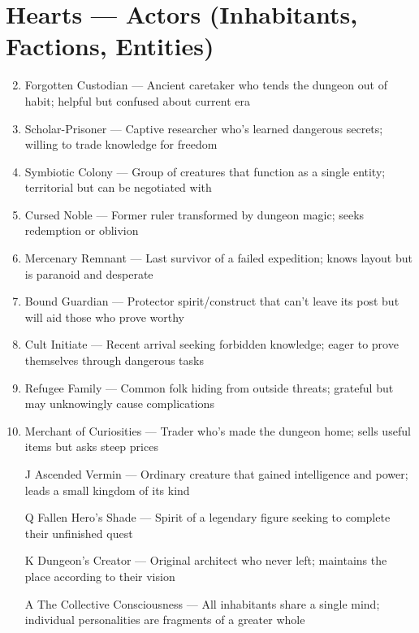\section*{Hearts --- Actors (Inhabitants, Factions, Entities)}
\label{sec:dungeon-actors}
\begin{enumerate}
\setcounter{enumi}{1}
\item Forgotten Custodian --- Ancient caretaker who tends the dungeon out of habit; helpful but confused about current era
\item Scholar-Prisoner --- Captive researcher who's learned dangerous secrets; willing to trade knowledge for freedom
\item Symbiotic Colony --- Group of creatures that function as a single entity; territorial but can be negotiated with
\item Cursed Noble --- Former ruler transformed by dungeon magic; seeks redemption or oblivion
\item Mercenary Remnant --- Last survivor of a failed expedition; knows layout but is paranoid and desperate
\item Bound Guardian --- Protector spirit/construct that can't leave its post but will aid those who prove worthy
\item Cult Initiate --- Recent arrival seeking forbidden knowledge; eager to prove themselves through dangerous tasks
\item Refugee Family --- Common folk hiding from outside threats; grateful but may unknowingly cause complications
\item Merchant of Curiosities --- Trader who's made the dungeon home; sells useful items but asks steep prices
\item[J] Ascended Vermin --- Ordinary creature that gained intelligence and power; leads a small kingdom of its kind
\item[Q] Fallen Hero's Shade --- Spirit of a legendary figure seeking to complete their unfinished quest
\item[K] Dungeon's Creator --- Original architect who never left; maintains the place according to their vision
\item[A] The Collective Consciousness --- All inhabitants share a single mind; individual personalities are fragments of a greater whole
\end{enumerate}

